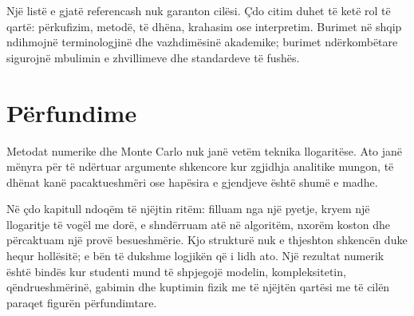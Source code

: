 \documentclass[11pt,oneside,openany]{book}
\begin{document}
Një listë e gjatë referencash nuk garanton cilësi. Çdo citim duhet të ketë rol të qartë: përkufizim, metodë, të dhëna, krahasim ose interpretim. Burimet në shqip ndihmojnë terminologjinë dhe vazhdimësinë akademike; burimet ndërkombëtare sigurojnë mbulimin e zhvillimeve dhe standardeve të fushës.



\backmatter
\chapter*{Përfundime}
Metodat numerike dhe Monte Carlo nuk janë vetëm teknika llogaritëse. Ato janë
mënyra për të ndërtuar argumente shkencore kur zgjidhja analitike mungon, të
dhënat kanë pacaktueshmëri ose hapësira e gjendjeve është shumë e madhe.

Në çdo kapitull ndoqëm të njëjtin ritëm: filluam nga një pyetje, kryem një
llogaritje të vogël me dorë, e shndërruam atë në algoritëm, nxorëm koston dhe
përcaktuam një provë besueshmërie. Kjo strukturë nuk e thjeshton shkencën duke
hequr hollësitë; e bën të dukshme logjikën që i lidh ato. Një rezultat numerik
është bindës kur studenti mund të shpjegojë modelin, kompleksitetin,
qëndrueshmërinë, gabimin dhe kuptimin fizik me të njëjtën qartësi me të cilën
paraqet figurën përfundimtare.
\end{document}
